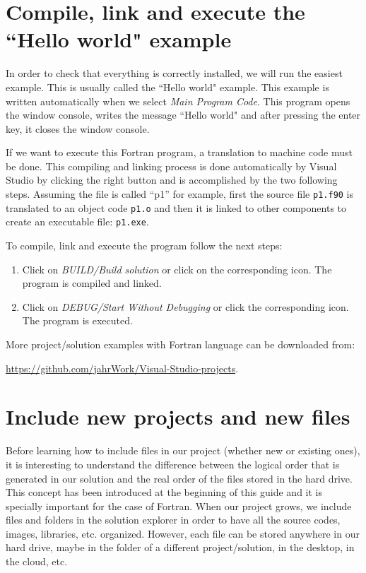     \section{Compile, link and execute the ``Hello world" example}

In order to check that everything is correctly installed, we will run the easiest example. This is usually called the ``Hello world" example. This example is written automatically when we select 
\textit{Main Program Code}. This program opens the window console, writes the message ``Hello world" and after pressing the enter key, it closes the window console. 

If we want to execute this Fortran program, a translation to machine code must be done. This compiling and linking process is done automatically by Visual Studio by clicking the right button and is accomplished by the two following steps. Assuming the file is called ``p1'' for example, first the source file \texttt{p1.f90} is translated to an object code \texttt{p1.o} and then it is linked to other components to create an executable file: \texttt{p1.exe}. 
  
\newpage
To compile, link and execute the program follow the next steps:

\begin{enumerate}[nosep]
	\item Click on \textit{BUILD/Build solution} or click on the corresponding icon. The program is compiled and linked. 
	\item Click on \textit{DEBUG/Start Without Debugging} or click the corresponding icon. The program is executed. 
\end{enumerate}
    
%   

\begin{IN}
    More project/solution examples with Fortran language can be downloaded from: 
    
     \url{https://github.com/jahrWork/Visual-Studio-projects}.
\end{IN}


    \section{Include new projects and new files} \label{sec:Include}

Before learning how to include files in our project (whether new or existing ones), it is interesting to understand the difference between the logical order that is generated in our solution and the real order of the files stored in the hard drive. This concept has been introduced at the beginning of this guide and it is specially important for the case of Fortran. When our project grows, we include files and folders in the solution explorer in order to have all the source codes, images, libraries, etc. organized. However, each file can be stored anywhere in our hard drive, maybe in the folder of a different project/solution, in the desktop, in the cloud, etc. 

